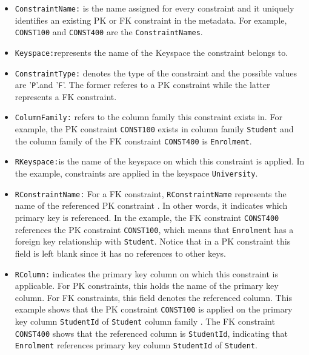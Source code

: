 \begin{itemize}
  
  \item \texttt{ConstraintName:} is the name assigned for
  every constraint and it uniquely identifies an
  existing \ac{PK} or \ac{FK} constraint in the metadata. 
   For example,  \texttt{CONST100} and \texttt{CONST400} are the
  \texttt{ConstraintNames}.
  
  \item \texttt{Keyspace:}represents the name of the Keyspace the constraint
  belongs to. 
  
  \item \texttt{ConstraintType:} denotes the type of the constraint and the
  possible values are '\texttt{P}'.and '\texttt{F}'.
  The former referes to  a \ac{PK} constraint while the latter represents  a
   \ac{FK} constraint. 
   
  \item \texttt{ColumnFamily:} refers to the column family this constraint
  exists in. For example,  the \ac{PK} constraint
  \texttt{CONST100}  exists in column family \texttt{Student} and the column
  family of the \ac{FK} constraint \texttt{CONST400}
  is \texttt{Enrolment}.
  
  \item \texttt{RKeyspace:}is the name of the keyspace on which this constraint
  is applied.  In the example, constraints  are applied in  the keyspace
  \texttt{University}.
  
    
  \item \texttt{RConstraintName:} For a \ac{FK}
  constraint,  \texttt{RConstraintName} represents the name of the
  referenced \ac{PK} constraint . In other words, it indicates which primary key
  is referenced. In the example,  the \ac{FK} constraint \texttt{CONST400}
   references the \ac{PK} constraint \texttt{CONST100},  which means that
   \texttt{Enrolment} has a foreign key relationship with \texttt{Student}.
   Notice that in a \ac{PK} constraint  this field is left blank since it
   has no references to other keys.
  
  \item \texttt{RColumn:}  indicates the primary key column on which this
  constraint is applicable.  For \ac{PK} constraints,  this holds the name of
  the primary key column. For \ac{FK} constraints, this field denotes
  the referenced column.  This example shows that the \ac{PK} constraint
  \texttt{CONST100} is applied on the primary key column \texttt{StudentId} of
  \texttt{Student} column family . The \ac{FK} constraint \texttt{CONST400}
  shows that the referenced column is \texttt{StudentId},  indicating that
  \texttt{Enrolment} references  primary key column \texttt{StudentId} of
  \texttt{Student}.
  

\end{itemize}

